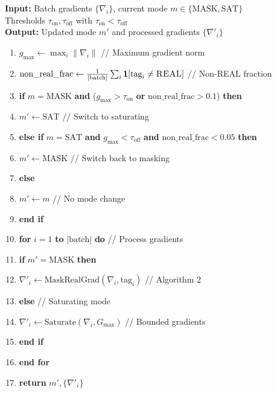 \documentclass[twoside,11pt]{article}
\newcommand{\trReal}{\textsc{REAL}}
\newcommand{\TAGREAL}{\trReal}
\begin{document}
\begin{tcolorbox}[colback=gray!5!white,colframe=gray!75!black,title=\textbf{Algorithm \refstepcounter{algctr}\thealgctr: Hybrid Gradient Policy with Hysteresis}]
\label{alg:hybrid-policy}
\textbf{Input:} Batch gradients $\{\nabla_i\}$, current mode $m \in \{\text{MASK}, \text{SAT}\}$ \\
 Thresholds $\tau_{\text{on}}, \tau_{\text{off}}$ with $\tau_{\text{on}} < \tau_{\text{off}}$ \\
\textbf{Output:} Updated mode $m'$ and processed gradients $\{\nabla'_i\}$

\begin{enumerate}
\item $g_{\max} \leftarrow \max_i \|\nabla_i\|$ \hfill // Maximum gradient norm
\item $\text{non\_real\_frac} \leftarrow \frac{1}{|\text{batch}|} \sum_i \mathbf{1}[\text{tag}_i \neq \TAGREAL]$ \hfill // Non-REAL fraction
\item \textbf{if} $m = \text{MASK}$ \textbf{and} ($g_{\max} > \tau_{\text{on}}$ \textbf{or} $\text{non\_real\_frac} > 0.1$) \textbf{then}
\item \quad $m' \leftarrow \text{SAT}$ \hfill // Switch to saturating
\item \textbf{else if} $m = \text{SAT}$ \textbf{and} $g_{\max} < \tau_{\text{off}}$ \textbf{and} $\text{non\_real\_frac} < 0.05$ \textbf{then}
\item \quad $m' \leftarrow \text{MASK}$ \hfill // Switch back to masking
\item \textbf{else}
\item \quad $m' \leftarrow m$ \hfill // No mode change
\item \textbf{end if}
\item \textbf{for} $i = 1$ \textbf{to} $|\text{batch}|$ \textbf{do} \hfill // Process gradients
\item \quad \textbf{if} $m' = \text{MASK}$ \textbf{then}
\item \quad \quad $\nabla'_i \leftarrow \text{MaskRealGrad}(\nabla_i, \text{tag}_i)$ \hfill // Algorithm 2
\item \quad \textbf{else} \hfill // Saturating mode
\item \quad \quad $\nabla'_i \leftarrow \text{Saturate}(\nabla_i, G_{\max})$ \hfill // Bounded gradients
\item \quad \textbf{end if}
\item \textbf{end for}
\item \textbf{return} $m', \{\nabla'_i\}$
\end{enumerate}
\end{tcolorbox}
\end{document}

